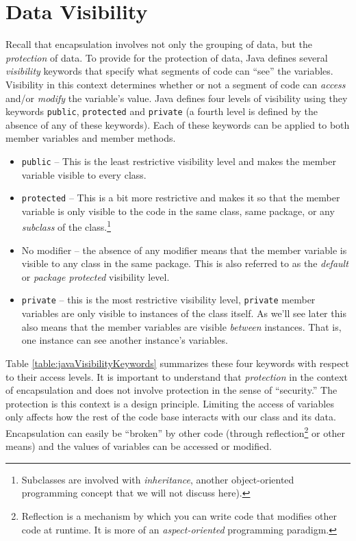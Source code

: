 \section{Data Visibility}

Recall that encapsulation involves not only the grouping of data, but
the \emph{protection} of data.  To provide for the protection of data, Java
defines several \emph{visibility} keywords that specify what segments
of code can ``see'' the variables.  Visibility in this context determines
whether or not a segment of code can \emph{access} and/or \emph{modify}
the variable's value.  Java defines four levels of visibility using
they keywords \texttt{public}, \texttt{protected}
and \texttt{private} (a fourth level is defined by the
absence of any of these keywords).  Each of these keywords can
be applied to both member variables and member methods.

\begin{itemize}
  \item \texttt{public} -- This is the least restrictive 
    visibility level and makes the member variable visible to every
    class.
  \item \texttt{protected} -- This is a bit more restrictive
    and makes it so that the member variable is only visible to the
    code in the same class, same package, or any \emph{subclass} of the 
    class.\footnote{Subclasses are involved with \emph{inheritance}, 
    another object-oriented programming concept that we will not
    discuss here).}
  \item No modifier -- the absence of any modifier means that the member
    variable is visible to any class in the same package.  This is also
  referred to as the \emph{default} or \emph{package protected} 
  visibility level.
  \item \texttt{private} -- this is the most restrictive 
    visibility level, \texttt{private} member variables are
    only visible to instances of the class itself.  As we'll see later
    this also means that the member variables are visible \emph{between}
    instances.  That is, one instance can see another instance's variables.
\end{itemize}

Table \ref{table:javaVisibilityKeywords} summarizes these four keywords
with respect to their access levels.  It is important to understand that
\emph{protection} in the context of encapsulation and does not involve
protection in the sense of ``security.''  The protection is this context
is a design principle.  Limiting the access of variables only affects 
how the rest of the code base interacts with our class and its data.  
Encapsulation can easily be ``broken'' by other code (through 
reflection\footnote{Reflection is a mechanism by which you can write
code that modifies other code at runtime.  It is more of an \emph{aspect-oriented} programming paradigm.}
or other means) and the values of variables can be accessed or modified.

